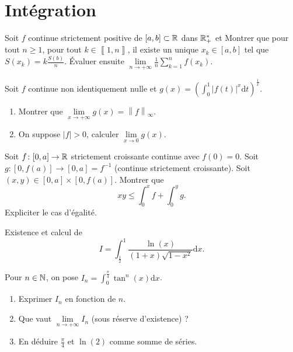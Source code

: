 \section{Intégration}

\begin{exercise}
    Soit $f$ continue strictement positive de $[a,b]\subset\mathbb{R}$ dans $\mathbb{R}_{+}^{*}$ et 
    Montrer que pour tout $n\geqslant1$, pour tout $k\in\left\llbracket1,n\right\rrbracket$, il existe un unique $x_{k}\in[a,b]$ tel que $S(x_{k})=k\frac{S(b)}{n}$. Évaluer ensuite $\lim\limits_{n\to+\infty}\frac{1}{n}\sum_{k=1}^{n}f(x_{k})$.
\end{exercise}

\begin{exercise}
    Soit $f$ continue non identiquement nulle et $g(x)=\left(\int_{0}^{1}\left\lvert f(t)\right\rvert^{x}\mathrm{d}t\right)^{\frac{1}{x}}$.
    \begin{enumerate}
        \item Montrer que $\lim\limits_{x\to+\infty}g(x)=\left\lVert f\right\rVert_{\infty}$.
        \item On suppose $\left\lvert f\right\rvert>0$, calculer $\lim\limits_{x\to0}g(x)$.
    \end{enumerate}
\end{exercise}

\begin{exercise}
    Soit $f\colon[0,a]\to\mathbb{R}$ strictement croissante continue avec $f(0)=0$. Soit $g\colon[0,f(a)]\to[0,a]=f^{-1}$ (continue strictement croissante). Soit $(x,y)\in[0,a]\times[0,f(a)]$. Montrer que 
    \begin{equation}
        xy\leqslant\int_{0}^{x}f+\int_{0}^{y}g.    
    \end{equation} 
    Expliciter le cas d'égalité.
\end{exercise}

\begin{exercise}
    Existence et calcul de \begin{equation}
        I=\int_{\frac{1}{2}}^{1}\frac{\ln(x)}{(1+x)\sqrt{1-x^{2}}}\mathrm{d}x.
    \end{equation}
\end{exercise}

\begin{exercise}
    Pour $n\in\mathbb{N}$, on pose $I_{n}=\int_{0}^{\frac{\pi}{4}}\tan^{n}(x)\mathrm{d}x$.
    \begin{enumerate}
        \item Exprimer $I_{n}$ en fonction de $n$.
        \item Que vaut $\lim\limits_{n\to+\infty}I_{n}$ (sous réserve d'existence) ?
        \item En déduire $\frac{\pi}{4}$ et $\ln(2)$ comme somme de séries.
    \end{enumerate}
\end{exercise}

